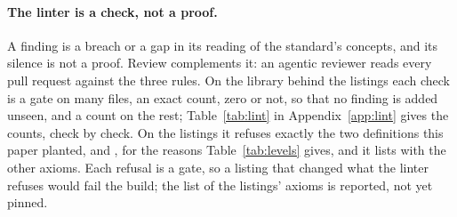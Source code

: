 \paragraph{The linter is a check, not a proof.}
A finding is a breach or a gap in its reading of the standard's concepts, and its silence is not a proof.
Review complements it: an agentic reviewer reads every pull request against the three rules.
On the library behind the listings each check is a gate on many files, an exact count, zero or not, so that no finding is added unseen, and a count on the rest; Table~\ref{tab:lint} in Appendix~\ref{app:lint} gives the counts, check by check.
On the listings it refuses exactly the two definitions this paper planted,  and , for the reasons Table~\ref{tab:levels} gives, and it lists  with the other axioms.
Each refusal is a gate, so a listing that changed what the linter refuses would fail the build; the list of the listings' axioms is reported, not yet pinned.

